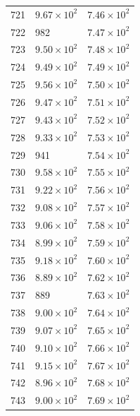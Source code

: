 \begin{table}[H]
\begin{tabular}{lll}
721 & $\displaystyle 9.67 \times 10^{2}$ & $\displaystyle 7.46 \times 10^{2}$ \\
722 & 982 & $\displaystyle 7.47 \times 10^{2}$ \\
723 & $\displaystyle 9.50 \times 10^{2}$ & $\displaystyle 7.48 \times 10^{2}$ \\
724 & $\displaystyle 9.49 \times 10^{2}$ & $\displaystyle 7.49 \times 10^{2}$ \\
725 & $\displaystyle 9.56 \times 10^{2}$ & $\displaystyle 7.50 \times 10^{2}$ \\
726 & $\displaystyle 9.47 \times 10^{2}$ & $\displaystyle 7.51 \times 10^{2}$ \\
727 & $\displaystyle 9.43 \times 10^{2}$ & $\displaystyle 7.52 \times 10^{2}$ \\
728 & $\displaystyle 9.33 \times 10^{2}$ & $\displaystyle 7.53 \times 10^{2}$ \\
729 & 941 & $\displaystyle 7.54 \times 10^{2}$ \\
730 & $\displaystyle 9.58 \times 10^{2}$ & $\displaystyle 7.55 \times 10^{2}$ \\
731 & $\displaystyle 9.22 \times 10^{2}$ & $\displaystyle 7.56 \times 10^{2}$ \\
732 & $\displaystyle 9.08 \times 10^{2}$ & $\displaystyle 7.57 \times 10^{2}$ \\
733 & $\displaystyle 9.06 \times 10^{2}$ & $\displaystyle 7.58 \times 10^{2}$ \\
734 & $\displaystyle 8.99 \times 10^{2}$ & $\displaystyle 7.59 \times 10^{2}$ \\
735 & $\displaystyle 9.18 \times 10^{2}$ & $\displaystyle 7.60 \times 10^{2}$ \\
736 & $\displaystyle 8.89 \times 10^{2}$ & $\displaystyle 7.62 \times 10^{2}$ \\
737 & 889 & $\displaystyle 7.63 \times 10^{2}$ \\
738 & $\displaystyle 9.00 \times 10^{2}$ & $\displaystyle 7.64 \times 10^{2}$ \\
739 & $\displaystyle 9.07 \times 10^{2}$ & $\displaystyle 7.65 \times 10^{2}$ \\
740 & $\displaystyle 9.10 \times 10^{2}$ & $\displaystyle 7.66 \times 10^{2}$ \\
741 & $\displaystyle 9.15 \times 10^{2}$ & $\displaystyle 7.67 \times 10^{2}$ \\
742 & $\displaystyle 8.96 \times 10^{2}$ & $\displaystyle 7.68 \times 10^{2}$ \\
743 & $\displaystyle 9.00 \times 10^{2}$ & $\displaystyle 7.69 \times 10^{2}$ \\

\end{tabular}
\end{table}
